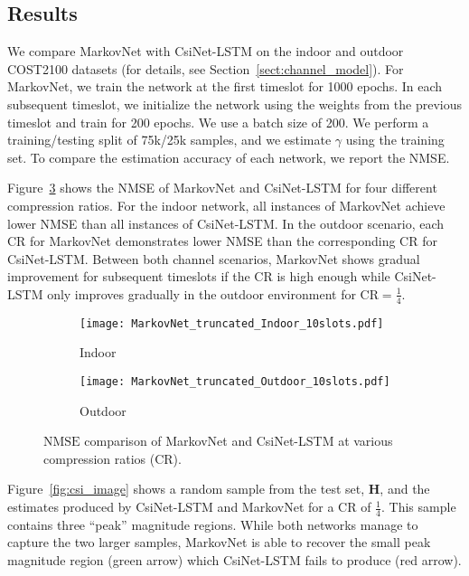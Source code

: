 \subsection{Results} \label{sec:markov-results}

We compare MarkovNet with CsiNet-LSTM \cite{ref:Wang2019CsiNetLSTM} on the indoor and outdoor COST2100 datasets (for details, see Section~\ref{sect:channel_model}). For MarkovNet, we train the network at the first timeslot for 1000 epochs. In each subsequent timeslot, we initialize the network using the weights from the previous timeslot and train for 200 epochs. We use a batch size of 200. We perform a training/testing split of 75k/25k samples, and we estimate $\gamma$ using the training set. To compare the estimation accuracy of each network, we report the NMSE.

Figure~\ref{fig:diffnet_result} shows the NMSE of MarkovNet and CsiNet-LSTM for four different compression ratios. For the indoor network, all instances of MarkovNet achieve lower NMSE than all instances of CsiNet-LSTM. In the outdoor scenario, each CR for MarkovNet demonstrates lower NMSE than the corresponding CR for CsiNet-LSTM. Between both channel scenarios, MarkovNet shows gradual improvement for subsequent timeslots if the CR is high enough while CsiNet-LSTM only improves gradually in the outdoor environment for CR$=\frac 14$.
\begin{figure}[!hbtp] \centering 
	\begin{subfigure}[t]{.45\textwidth}
		\centering
		\texttt{[image: MarkovNet\_truncated\_Indoor\_10slots.pdf]}
		\caption{Indoor}
		\label{fig:diffnet_indoor} 
	\end{subfigure}
	\begin{subfigure}[t]{.45\textwidth}
		\centering
		\texttt{[image: MarkovNet\_truncated\_Outdoor\_10slots.pdf]}
		\caption{Outdoor}
		\label{fig:diffnet_outdoor} 
	\end{subfigure}
	\caption{$\text{NMSE}$ comparison of MarkovNet and CsiNet-LSTM 
	at various compression ratios (CR).} 
	\label{fig:diffnet_result} \vspace*{-2mm}
\end{figure}  
Figure~\ref{fig:csi_image} shows a random sample from the test set, $\mathbf H$, and the estimates produced by CsiNet-LSTM and MarkovNet for a CR of $\frac 14$. This sample contains three ``peak'' magnitude regions. While both networks manage to capture the two larger samples, MarkovNet is able to recover the small peak magnitude region ({\color{darkgreen}green arrow}) which CsiNet-LSTM fails to produce ({\color{red}red arrow}).

